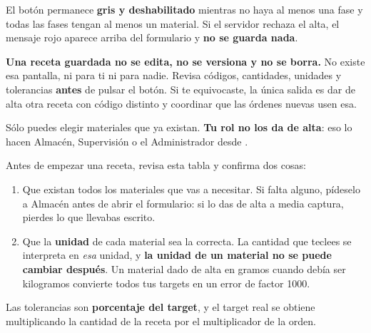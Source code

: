 \vspace{6pt}

El botón  permanece \textbf{gris y deshabilitado} mientras no
haya al menos una fase y todas las fases tengan al menos un material. Si el servidor
rechaza el alta, el mensaje rojo aparece arriba del formulario y \textbf{no se guarda nada}.

\begin{cajaOjo}
\textbf{Una receta guardada no se edita, no se versiona y no se borra.} No existe esa
pantalla, ni para ti ni para nadie. Revisa códigos, cantidades, unidades y tolerancias
\textbf{antes} de pulsar el botón. Si te equivocaste, la única salida es dar de alta
otra receta con código distinto y coordinar que las órdenes nuevas usen esa.
\end{cajaOjo}

\newpage
{}

Sólo puedes elegir materiales que ya existan. \textbf{Tu rol no los da de alta}: eso lo
hacen Almacén, Supervisión o el Administrador desde .


\vspace{6pt}

Antes de empezar una receta, revisa esta tabla y confirma dos cosas:

\begin{enumerate}
    \item Que existan todos los materiales que vas a necesitar. Si falta alguno,
          pídeselo a Almacén antes de abrir el formulario: si lo das de alta a media
          captura, pierdes lo que llevabas escrito.
    \item Que la \textbf{unidad} de cada material sea la correcta. La cantidad que
          teclees se interpreta en \textit{esa} unidad, y \textbf{la unidad de un
          material no se puede cambiar después}. Un material dado de alta en gramos
          cuando debía ser kilogramos convierte todos tus targets en un error de
          factor 1000.
\end{enumerate}

\newpage
{}


Las tolerancias son \textbf{porcentaje del target}, y el target real se obtiene
multiplicando la cantidad de la receta por el multiplicador de la orden.


